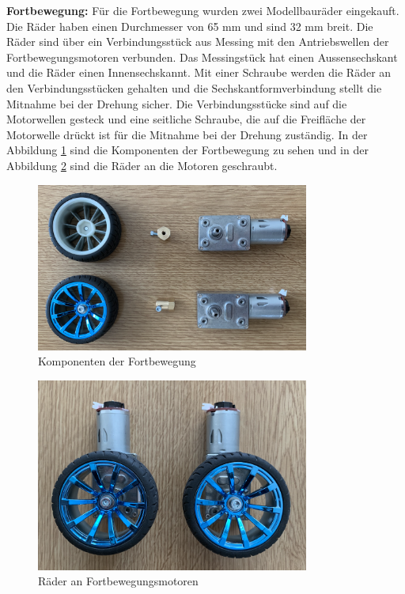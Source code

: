 \textbf{Fortbewegung:} Für die Fortbewegung wurden zwei Modellbauräder eingekauft. Die Räder haben einen Durchmesser von 65 mm und sind 32 mm breit. Die Räder sind über ein Verbindungsstück aus Messing mit den Antriebswellen der Fortbewegungsmotoren verbunden. Das Messingstück hat einen Aussensechskant und die Räder einen Innensechskannt. Mit einer Schraube werden die Räder an den Verbindungsstücken gehalten und die Sechskantformverbindung stellt die Mitnahme bei der Drehung sicher. Die Verbindungsstücke sind auf die Motorwellen gesteck und eine seitliche Schraube, die auf die Freifläche der Motorwelle drückt ist für die Mitnahme bei der Drehung zuständig. In der Abbildung \ref{fig:Komponenten der Fortbewegung} sind die Komponenten der Fortbewegung zu sehen und in der Abbildung \ref{fig:Räder an Fortbewegungsmotoren} sind die Räder an die Motoren geschraubt.

\begin{figure}[H]
  \includegraphics[width=0.8\textwidth]{img/Gerät Aufbau/Räder zerlegt.png}
  \centering
  \caption{Komponenten der Fortbewegung}
  \label{fig:Komponenten der Fortbewegung}
\end{figure}

\begin{figure}[H]
  \includegraphics[width=0.8\textwidth]{img/Gerät Aufbau/Räder mit Motor.png}
  \centering
  \caption{Räder an Fortbewegungsmotoren}
  \label{fig:Räder an Fortbewegungsmotoren}
\end{figure}

